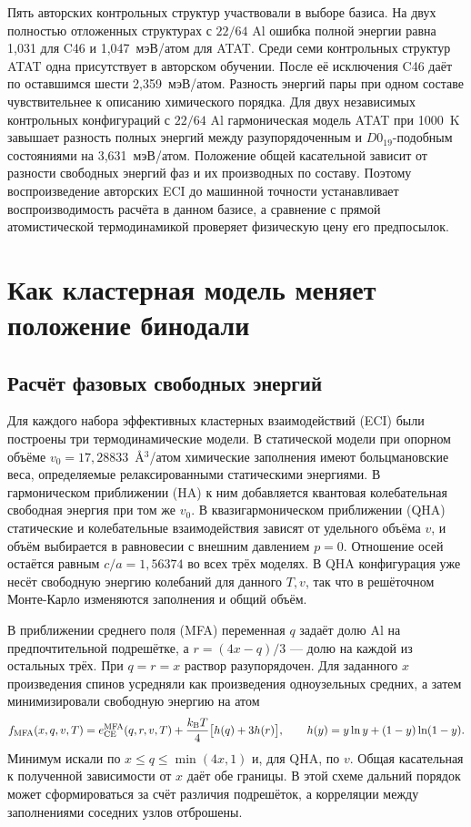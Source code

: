 \documentclass[11pt,a4paper]{article}
\begin{document}
Пять авторских контрольных структур участвовали в выборе базиса. На
двух полностью отложенных структурах с \(22/64\) Al ошибка полной
энергии равна 1,031 для C46 и 1,047~мэВ/атом для ATAT. Среди семи
контрольных структур ATAT одна присутствует в авторском обучении.
После её исключения C46 даёт по оставшимся шести 2,359~мэВ/атом.
Разность энергий пары при одном составе чувствительнее к описанию
химического порядка. Для двух независимых контрольных конфигураций
с \(22/64\) Al гармоническая модель ATAT при 1000~K завышает разность
полных энергий между разупорядоченным и \(D0_{19}\)-подобным состояниями
на 3,631~мэВ/атом. Положение общей касательной зависит
от разности свободных энергий фаз и их производных по составу.
Поэтому воспроизведение авторских ECI до машинной точности устанавливает
воспроизводимость расчёта в данном базисе, а сравнение с прямой
атомистической термодинамикой проверяет физическую цену его предпосылок.

\section{Как кластерная модель меняет положение бинодали}
\label{sec:ce-phases}

\subsection{Расчёт фазовых свободных энергий}
Для каждого набора эффективных кластерных взаимодействий (ECI) были
построены три термодинамические модели. В статической модели при опорном
объёме \(v_0=17{,}28833\)~\AA$^3$/атом химические заполнения имеют
больцмановские веса, определяемые релаксированными статическими энергиями.
В гармоническом приближении (HA) к ним добавляется квантовая колебательная
свободная энергия при том же \(v_0\). В квазигармоническом приближении
(QHA) статические и колебательные взаимодействия зависят от удельного
объёма \(v\), и объём выбирается в равновесии с внешним давлением \(p=0\).
Отношение осей остаётся равным \(c/a=1{,}56374\) во всех трёх моделях.
В QHA конфигурация уже несёт свободную энергию колебаний для данного
\(T,v\), так что в решёточном Монте-Карло изменяются заполнения и
общий объём.

В приближении среднего поля (MFA) переменная \(q\) задаёт долю Al
на предпочтительной подрешётке, а \(r=(4x-q)/3\) --- долю на каждой
из остальных трёх. При \(q=r=x\) раствор разупорядочен. Для заданного \(x\)
произведения спинов усредняли как произведения одноузельных средних,
а затем минимизировали свободную энергию на атом
\[
 f_{\rm MFA}(x,q,v,T)=e_{\rm CE}^{\rm MFA}(q,r,v,T)
       +\frac{k_{\rm B}T}{4}\big[h(q)+3h(r)\big],
 \qquad h(y)=y\ln y+(1-y)\ln(1-y).
\]
Минимум искали по \(x\le q\le\min(4x,1)\) и, для QHA, по \(v\).
Общая касательная к полученной зависимости от \(x\) даёт обе границы.
В этой схеме дальний порядок может сформироваться за счёт различия
подрешёток, а корреляции между заполнениями соседних узлов отброшены.
\end{document}
